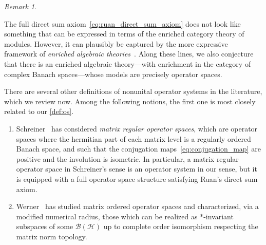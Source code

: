 \documentclass[11pt,onecolumn]{article}
\theoremstyle{plain}
\theoremstyle{remark}
\newtheorem{remark}[remark]{Remark}
\theoremstyle{definition}
\begin{document}
\begin{remark}
\begin{enumerate}
			The full direct sum axiom~\eqref{eq:ruan_direct_sum_axiom} does not look like something that can be expressed in terms of the enriched category theory of modules.
			However, it can plausibly be captured by the more expressive framework of \emph{enriched algebraic theories}~\cite{LucyshynWrightEnrichedAlgebraicTheories}.
			Along these lines, we also conjecture that there is an enriched algebraic theory---with enrichment in the category of complex Banach spaces---whose models are precisely operator spaces.
	\end{enumerate}
	There are several other definitions of nonunital operator systems in the literature, which we review now.
	Among the following notions, the first one is most closely related to our \cref{def:os}.
	\begin{enumerate}[resume]
		\item Schreiner~\cite{SchreinerMatrixRegular} has considered \emph{matrix regular operator spaces},
			which are operator spaces where the hermitian part of each matrix level is a regularly ordered Banach space,
			and such that the conjugation maps~\eqref{eq:conjugation_map} are positive and the involution is isometric.
			In particular, a matrix regular operator space in Schreiner's sense is an operator system in our sense,
			but it is equipped with a full operator space structure satisfying Ruan's direct sum axiom.
		\item Werner~\cite{WernerSubspaces} has studied matrix ordered operator spaces and characterized, via a modified numerical radius,
			those which can be realized as $*$-invariant subspaces of some $\mathcal{B}(\mathcal{H})$ up to complete order isomorphism respecting the matrix norm topology.


\end{enumerate}
\end{remark}
\end{document}
